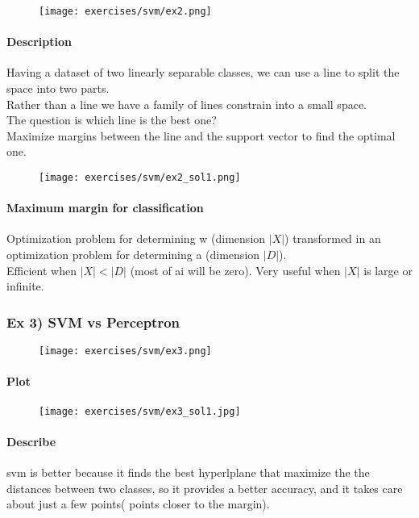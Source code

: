 \begin{figure}[H]
    \centering
    \texttt{[image: exercises/svm/ex2.png]}
\end{figure}

\paragraph{Description}
Having a dataset of two linearly separable classes, we can use a line to split the space into two parts.\\
Rather than a line we have a family of lines constrain into a small space.\\
The question is which line is the best one?\\
Maximize margins between the line and the support vector to find the optimal one.

\begin{figure}[H]
    \centering
    \texttt{[image: exercises/svm/ex2\_sol1.png]}
\end{figure}

\paragraph{Maximum margin for classification}
Optimization problem for determining w (dimension $|X|$) transformed in an optimization problem for determining a (dimension $|D|$).\\
Efficient when $|X| < |D|$ (most of ai will be zero). Very useful when $|X|$ is large or infinite.


\subsubsection{Ex 3) SVM vs Perceptron}

\begin{figure}[H]
    \centering
    \texttt{[image: exercises/svm/ex3.png]}
\end{figure}

\paragraph{Plot}
\begin{figure}[H]
    \centering
    \texttt{[image: exercises/svm/ex3\_sol1.jpg]}
\end{figure}

\paragraph{Describe}
svm is better because it finds the best hyperlplane that maximize the the distances between two classes, so it provides a better accuracy, and it takes care about just a few points( points closer to the margin). \\

